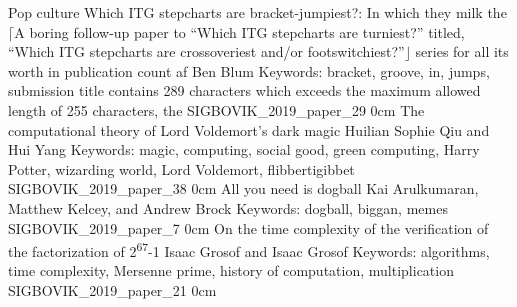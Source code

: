 \addtrack
	{}{Pop culture}
\addpaper
	{Which ITG stepcharts are bracket-jumpiest?: In which they milk the $\lceil$A boring follow-up paper to ``Which ITG stepcharts are turniest?'' titled, ``Which ITG stepcharts are crossoveriest and/or footswitchiest?''$\rfloor$ series for all its worth in publication count af}
	{Ben Blum}
	{Keywords: bracket, groove, in, jumps, submission title contains 289 characters which exceeds the maximum allowed length of 255 characters, the}
	{SIGBOVIK_2019_paper_29}
	{0cm}
	{}
\addpaper
	{The computational theory of Lord Voldemort's dark magic}
	{Huilian Sophie Qiu and Hui Yang}
	{Keywords: magic, computing, social good, green computing, Harry Potter, wizarding world, Lord Voldemort, flibbertigibbet}
	{SIGBOVIK_2019_paper_38}
	{0cm}
	{}
\addpaper
	{All you need is dogball}
	{Kai Arulkumaran, Matthew Kelcey, and Andrew Brock}
	{Keywords: dogball, biggan, memes}
	{SIGBOVIK_2019_paper_7}
	{0cm}
	{}
\addpaper
	{On the time complexity of the verification of the factorization of 2\textsuperscript{67}-1}
	{Isaac Grosof and Isaac Grosof}
	{Keywords: algorithms, time complexity, Mersenne prime, history of computation, multiplication}
	{SIGBOVIK_2019_paper_21}
	{0cm}
	{}
